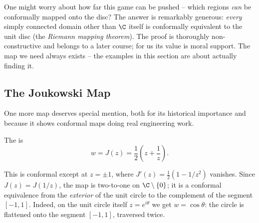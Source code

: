 \begin{remark}
	One might worry about how far this game can be pushed -- which regions \emph{can} be conformally mapped onto the disc? The answer is remarkably generous: \emph{every} simply connected domain other than $\C$ itself is conformally equivalent to the unit disc (the \emph{Riemann mapping theorem}). The proof is thoroughly non-constructive and belongs to a later course; for us its value is moral support. The map we need always exists -- the examples in this section are about actually finding it.
\end{remark}

\subsection{The Joukowski Map}

One more map deserves special mention, both for its historical importance and because it shows conformal maps doing real engineering work.

\begin{definition}
	The  is
	$$
	w = J(z) = \frac{1}{2}\left(z + \frac{1}{z}\right).
	$$
\end{definition}

This is conformal except at $z = \pm 1$, where $J'(z) = \frac{1}{2}(1 - 1/z^2)$ vanishes. Since $J(z) = J(1/z)$, the map is two-to-one on $\C \setminus \{0\}$; it is a conformal equivalence from the \emph{exterior} of the unit circle to the complement of the segment $[-1, 1]$. Indeed, on the unit circle itself $z = e^{i\theta}$ we get $w = \cos\theta$: the circle is flattened onto the segment $[-1, 1]$, traversed twice.

